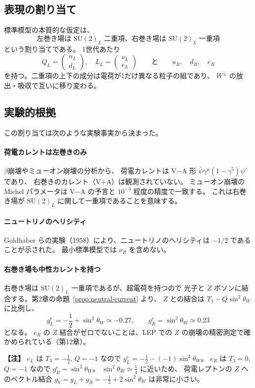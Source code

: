 \documentclass[uplatex,dvipdfmx,a4paper,11pt,openany]{jsbook}
\newenvironment{note}{\vspace{1ex}\par\footnotesize\noindent\textbf{【注】}}{\par\vspace{1ex}}
\numberwithin{equation}{chapter}
\theoremstyle{definition}
\theoremstyle{plain}
\theoremstyle{remark}
\newcommand{\SU}{\mathrm{SU}}
\begin{document}
\subsection{表現の割り当て}
標準模型の本質的な仮定は、
\begin{equation}
\boxed{
\text{左巻き場は }\SU(2)_L\text{ 二重項、右巻き場は }\SU(2)_L\text{ 一重項}
}
\end{equation}
という割り当てである。
1世代あたり
\begin{equation}
Q_L=\begin{pmatrix}u_L\\ d_L\end{pmatrix},\quad
L_L=\begin{pmatrix}\nu_L\\ e_L\end{pmatrix}
\qquad\text{と}\qquad
u_R,\quad d_R,\quad e_R
\end{equation}
を持つ。二重項の上下の成分は電荷が1だけ異なる粒子の組であり、
$W^\pm$ の放出・吸収で互いに移り変わる。
\subsection{実験的根拠}
この割り当ては次のような実験事実から決まった。
\paragraph{荷電カレントは左巻きのみ}
$\beta$崩壊やミューオン崩壊の分析から、
荷電カレントは V$-$A 形 $\bar\psi\gamma^\mu(1-\gamma^5)\psi'$ であり、
右巻きのカレント（V$+$A）は観測されていない。
ミューオン崩壊の Michel パラメータは V$-$A の予言と $10^{-3}$ 程度の精度で一致する。
これは右巻き場が $\SU(2)_L$ に関して一重項であることを意味する。
\paragraph{ニュートリノのヘリシティ}
Goldhaber らの実験（1958）により、ニュートリノのヘリシティは $-1/2$ であることが示された。
最小標準模型では $\nu_R$ を含めない。
\paragraph{右巻き場も中性カレントを持つ}
右巻き場は $\SU(2)_L$ 一重項であるが、超電荷を持つので
光子と $Z$ ボソンに結合する。第2章の命題~\ref{prop:neutral-current} より、
$Z$ との結合は $T_3-Q\sin^2\theta_W$ に比例し、
\begin{equation}
g_L^e=-\frac12+\sin^2\theta_W\simeq-0.27,
\qquad
g_R^e=\sin^2\theta_W\simeq0.23
\end{equation}
となる。
$e_R$ の $Z$ 結合がゼロでないことは、LEP での $Z$ の崩壊の精密測定で確かめられている（第12章）。
\begin{note}
$e_L$ は $T_3=-\frac12$, $Q=-1$ なので $g_L^e=-\frac12-(-1)\sin^2\theta_W$。
$e_R$ は $T_3=0$, $Q=-1$ なので $g_R^e=\sin^2\theta_W$。
$\sin^2\theta_W\simeq\frac14$ に近いため、
荷電レプトンの $Z$ へのベクトル結合 $g_V=g_L+g_R=-\frac12+2\sin^2\theta_W$ は非常に小さい。
\end{note}
\end{document}
